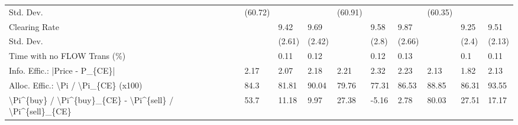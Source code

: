 \begin{tabular}{llllllllll}
 Std. Dev.                                                 & (60.72)  &          &          & (60.91)  &          &          & (60.35)   &           &           \\
 Clearing Rate                                             &          & 9.42     & 9.69     &          & 9.58     & 9.87     &           & 9.25      & 9.51      \\
 Std. Dev.                                                 &          & (2.61)   & (2.42)   &          & (2.8)    & (2.66)   &           & (2.4)     & (2.13)    \\
 Time with no FLOW Trans (\%)                               &          & 0.11     & 0.12     &          & 0.12     & 0.13     &           & 0.1       & 0.11      \\
 Info. Effic.: |Price - P\_\{CE\}|                            & 2.17     & 2.07     & 2.18     & 2.21     & 2.32     & 2.23     & 2.13      & 1.82      & 2.13      \\
 Alloc. Effic.: \textbackslash{}Pi / \textbackslash{}Pi\_\{CE\} (x100)                      & 84.3     & 81.81    & 90.04    & 79.76    & 77.31    & 86.53    & 88.85     & 86.31     & 93.55     \\
 \textbackslash{}Pi\^{}\{buy\} / \textbackslash{}Pi\^{}\{buy\}\_\{CE\} - \textbackslash{}Pi\^{}\{sell\} / \textbackslash{}Pi\^{}\{sell\}\_\{CE\} & 53.7     & 11.18    & 9.97     & 27.38    & -5.16    & 2.78     & 80.03     & 27.51     & 17.17     \\
\hline
\end{tabular}